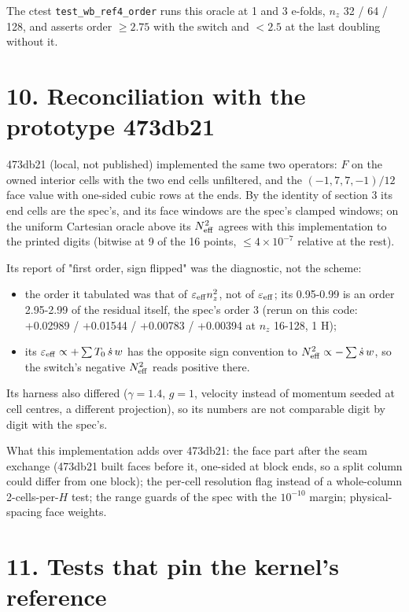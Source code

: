 \documentclass[11pt,a4paper]{article}
\begin{document}
The ctest \texttt{test\_wb\_ref4\_order} runs this oracle at 1 and 3 e-folds, $n_z$ 32 / 64 / 128, and asserts order
$\ge 2.75$ with the switch and $< 2.5$ at the last doubling without it.

\section*{10. Reconciliation with the prototype 473db21}

473db21 (local, not published) implemented the same two operators: $F$ on the owned interior cells with the
two end cells unfiltered, and the $(-1, 7, 7, -1)/12$ face value with one-sided cubic rows at the ends.
By the identity of section 3 its end cells are the spec's, and its face windows are the spec's clamped windows;
on the uniform Cartesian oracle above its $N^2_{\rm eff}$ agrees with this implementation to the printed
digits (bitwise at 9 of the 16 points, $\le 4\times10^{-7}$ relative at the rest).

Its report of "first order, sign flipped" was the diagnostic, not the scheme:

\begin{itemize}
\item the order it tabulated was that of $\varepsilon_{\rm eff}n_z^2$, not of $\varepsilon_{\rm eff}$; its 0.95-0.99 is an
  order 2.95-2.99 of the residual itself, the spec's order 3 (rerun on this code: +0.02989 / +0.01544 /
  +0.00783 / +0.00394 at $n_z$ 16-128, 1 H);
\item its $\varepsilon_{\rm eff} \propto +\sum T_0\,\dot s\, w$ has the opposite sign convention to
  $N^2_{\rm eff} \propto -\sum\dot s\, w$, so the switch's negative $N^2_{\rm eff}$ reads positive there.
\end{itemize}

Its harness also differed ($\gamma = 1.4$, $g = 1$, velocity instead of momentum seeded at cell centres, a
different projection), so its numbers are not comparable digit by digit with the spec's.

What this implementation adds over 473db21: the face part after the seam exchange (473db21 built faces before
it, one-sided at block ends, so a split column could differ from one block); the per-cell resolution flag
instead of a whole-column 2-cells-per-$H$ test; the range guards of the spec with the $10^{-10}$ margin;
physical-spacing face weights.

\section*{11. Tests that pin the kernel's reference}
\end{document}
